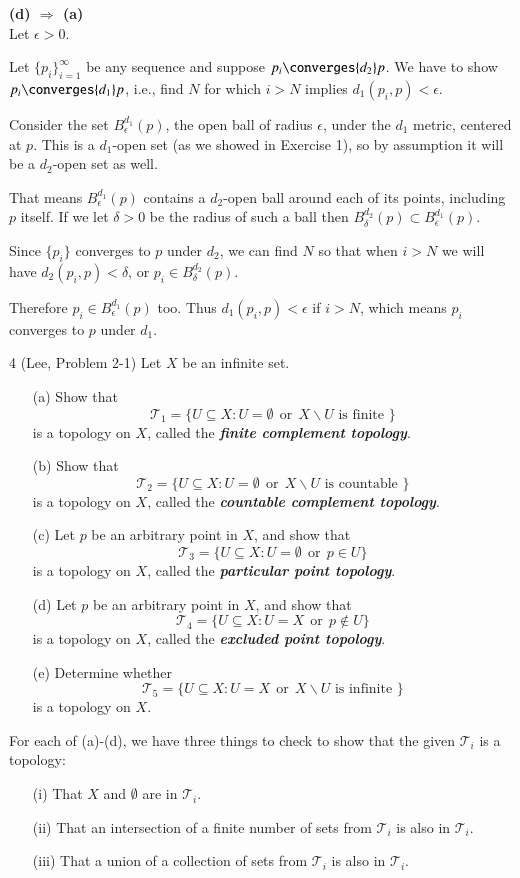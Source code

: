 \documentclass{homework}
\newcommand{\Tau}{\ensuremath{\mathcal{T}}}
\newcommand{\OR}{\ensuremath{\ \ \text{or}\ \ }}
\begin{document}
\textbf{(d) $\Longrightarrow$ (a)}\\
Let $\epsilon>0$.

Let $\{p_i\}_{i=1}^\infty$ be any sequence and suppose $p_i\converges{d_2}p$.
We have to show $p_i\converges{d_1}p$, i.e., find $N$ for which $i>N$
implies $d_1(p_i,p)<\epsilon$.

Consider the set $B^{d_1}_\epsilon(p)$, the open ball of radius $\epsilon$,
under the $d_1$ metric, centered at $p$.  This is a $d_1$-open set (as we showed
in Exercise 1), so by assumption it will be a $d_2$-open set as well.

That means $B^{d_1}_\epsilon(p)$ contains a $d_2$-open ball around each of
its points, including $p$ itself.  If we let $\delta>0$ be the radius of such
a ball then $B^{d_2}_\delta(p) \subset B^{d_1}_\epsilon(p)$.

Since $\{p_i\}$ converges to $p$ under $d_2$, we can find $N$ so that when
$i>N$ we will have $d_2(p_i,p)<\delta$, or $p_i\in B^{d_2}_\delta(p)$.

Therefore $p_i\in B^{d_1}_\epsilon(p)$ too.
Thus $d_1(p_i,p)<\epsilon$ if $i>N$, which means $p_i$ converges to $p$
under $d_1$.

\hrulefill
\begin{exercise}{4 (Lee, Problem 2-1)}
Let $X$ be an infinite set.
\begin{itemize}
\item[(a)] Show that
$$ \Tau_1 = \{ U \subseteq X : U=\emptyset \OR X\backslash U
                               \text{ is finite } \} $$
is a topology on $X$, called the \textbf{\textit{finite complement
topology}}.
\item[(b)] Show that
$$ \Tau_2 = \{ U \subseteq X : U=\emptyset \OR X\backslash U
                               \text{ is countable } \} $$
is a topology on $X$, called the \textbf{\textit{countable complement
topology}}.
\item[(c)] Let $p$ be an arbitrary point in $X$, and show that
$$ \Tau_3 = \{ U \subseteq X : U=\emptyset \OR p\in U\} $$
is a topology on $X$, called the \textbf{\textit{particular point
topology}}.
\item[(d)] Let $p$ be an arbitrary point in $X$, and show that
$$ \Tau_4 = \{ U \subseteq X : U=X \OR p\not\in U\} $$
is a topology on $X$, called the \textbf{\textit{excluded point
topology}}.
\item[(e)] Determine whether
$$ \Tau_5 = \{ U \subseteq X : U=X \OR X\backslash U
                               \text{ is infinite } \} $$
is a topology on $X$.
\end{itemize}
\end{exercise}
\solution
For each of (a)-(d), we have three things to check to show that
the given $\Tau_i$ is a topology:
\begin{itemize}
\item[(i)] That $X$ and $\emptyset$ are in $\Tau_i$.
\item[(ii)] That an intersection of a finite number of sets
from $\Tau_i$ is also in $\Tau_i$.
\item[(iii)] That a union of a collection of sets from $\Tau_i$
is also in $\Tau_i$.
\end{itemize}
\end{document}
